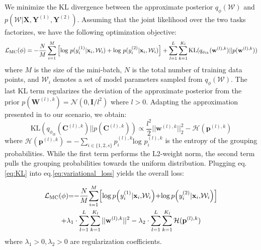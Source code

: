 We minimize the KL divergence between the approximate posterior $q_{\phi}(\mathcal{W})$ and $p(\mathcal{W}|\textbf{X}, \mathbf{Y}^{(1)}, \mathbf{Y}^{(2)})$. Assuming that the joint likelihood over the two tasks factorizes, we have the following optimization objective:
\begin{equation}\label{eq:variational_loss}
    \mathcal{L}_{\text{MC}}(\phi) = -\frac{N}{M}\sum_{i=1}^{M} \Big{[}\text{log } p(y^{(1)}_i|\mathbf{x}_i, \mathcal{W}_i) + \text{log }p(y^{(2)}_i|\mathbf{x}_i, \mathcal{W}_i)\Big{]} + \sum_{l=1}^{L}\sum_{k=1}^{K_l}\text{KL}(q_{\phi_{lk}}(\mathbf{w}^{(l),k})||p(\mathbf{w}^{(l),k}))
\end{equation}
where $M$ is the size of the mini-batch, $N$ is the total number of training data points, and $\mathcal{W}_i$ denotes a set of model parameters sampled from $q_{\phi}(\mathcal{W})$. The last KL term regularizes the deviation of the approximate posterior from the prior $p(\mathbf{W}^{(l),k})=\mathcal{N}(0, \mathbf{I}/l^{2})$ where $l>0$. Adapting the approximation presented in \cite{gal2016uncertainty} to our scenario, we obtain:
\begin{equation}\label{eq:KL}
    \text{KL}(q_{\phi_{lk}}(\mathbf{C}^{(l),k})||p(\mathbf{C}^{(l),k})) \propto \frac{l^2}{2}||\mathbf{w}^{(l),k}||^{2}
    _{2} - \mathcal{H}(\mathbf{p}^{(l),k})
\end{equation}
where $\mathcal{H}(\mathbf{p}^{(l),k})=-\sum_{i\in \{1,2,s\}}p^{(l),k}_i\text{log }p^{(l),k}_i$ is the entropy of the grouping probabilities. While the first term performs the L2-weight norm, the second term pulls the grouping probabilities towards the uniform distribution. Plugging eq.\eqref{eq:KL} into eq.\eqref{eq:variational_loss} yields the overall loss: 

\begin{multline}\label{eq:total_loss}
\medmuskip=0mu
\thinmuskip=0mu
\thickmuskip=0mu
\mathcal{L}_{\text{MC}}(\phi) = -\frac{N}{M}\sum_{i=1}^{M} \left[\log\text{\,} p\left(y^{(1)}_i|\mathbf{x}_i, \mathcal{W}_i\right) + \log\text{\,} p\left(y^{(2)}_i|\mathbf{x}_i, \mathcal{W}_i\right)\right] \\ + \lambda_{1} \cdot \sum_{l=1}^{L}\sum_{k=1}^{K_l}||\mathbf{w}^{(l),k}||^{2} - \lambda_{2} \cdot \sum_{l=1}^{L}\sum_{k=1}^{K_l}\mathcal{H}(\mathbf{p}^{(l),k})
\end{multline}
where $\lambda_1>0, \lambda_2>0$ are regularization coefficients. 

